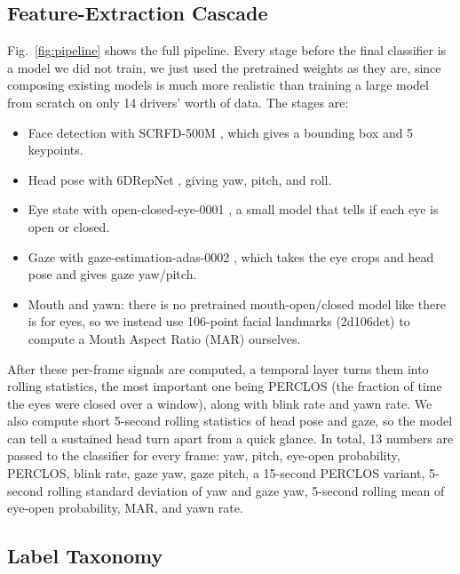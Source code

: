 \documentclass[conference]{IEEEtran}
\begin{document}
\subsection{Feature-Extraction Cascade}

Fig.~\ref{fig:pipeline} shows the full pipeline. Every stage before the final classifier is a model we did not train, we just used the pretrained weights as they are, since composing existing models is much more realistic than training a large model from scratch on only 14 drivers' worth of data. The stages are:
\begin{itemize}
    \item[①] Face detection with SCRFD-500M \cite{b_scrfd}, which gives a bounding box and 5 keypoints.
    \item[②] Head pose with 6DRepNet \cite{b_6drepnet}, giving yaw, pitch, and roll.
    \item[③] Eye state with open-closed-eye-0001 \cite{b_openvino_eye}, a small model that tells if each eye is open or closed.
    \item[⑤] Gaze with gaze-estimation-adas-0002 \cite{b_openvino_gaze}, which takes the eye crops and head pose and gives gaze yaw/pitch.
    \item Mouth and yawn: there is no pretrained mouth-open/closed model like there is for eyes, so we instead use 106-point facial landmarks (2d106det) to compute a Mouth Aspect Ratio (MAR) ourselves.
\end{itemize}
After these per-frame signals are computed, a temporal layer turns them into rolling statistics, the most important one being PERCLOS (the fraction of time the eyes were closed over a window), along with blink rate and yawn rate. We also compute short 5-second rolling statistics of head pose and gaze, so the model can tell a sustained head turn apart from a quick glance. In total, 13 numbers are passed to the classifier for every frame: yaw, pitch, eye-open probability, PERCLOS, blink rate, gaze yaw, gaze pitch, a 15-second PERCLOS variant, 5-second rolling standard deviation of yaw and gaze yaw, 5-second rolling mean of eye-open probability, MAR, and yawn rate.

\subsection{Label Taxonomy}
\label{sec:taxonomy}
\end{document}
